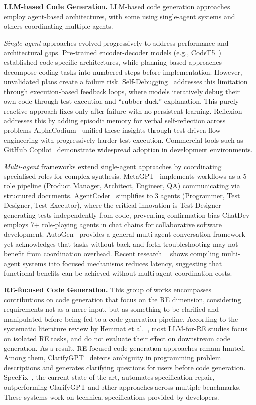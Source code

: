 \documentclass[sigconf,screen]{acmart}
\begin{document}
\textbf{LLM-based Code Generation.} LLM-based code generation approaches employ agent-based architectures, with some using single-agent systems and others coordinating multiple agents.

\textit{Single-agent} approaches evolved progressively to address performance and architectural gaps. Pre-trained encoder-decoder models (e.g., CodeT5~\cite{wang2021codet5}) established code-specific architectures, while planning-based approaches~\cite{jiang2024self} decompose coding tasks into numbered steps before implementation.
However, unvalidated plans create a failure risk. Self-Debugging~\cite{chen2023selfdebug} addresses this limitation through execution-based feedback loops, where models iteratively debug their own code through test execution and ``rubber duck'' explanation.
This purely reactive approach fixes only after failure with no persistent learning. Reflexion~\cite{shinn2023reflexion} addresses this by adding episodic memory for verbal self-reflection across problems
AlphaCodium~\cite{ridnik2024alphacodium} unified these insights through test-driven flow engineering with progressively harder test execution.
Commercial tools such as GitHub Copilot~\cite{copilot} demonstrate widespread adoption in development environments.

\textit{Multi-agent} frameworks extend single-agent approaches by coordinating specialised roles for complex synthesis. MetaGPT~\cite{hong2023metagpt} implements workflows as a 5-role pipeline (Product Manager, Architect, Engineer, QA) communicating via structured documents.
AgentCoder~\cite{huang2024agentcoder} simplifies to 3 agents (Programmer, Test Designer, Test Executor), where the critical innovation is Test Designer generating tests independently from code, preventing confirmation bias
ChatDev~\cite{chatdev} employs 7+ role-playing agents in chat chains for collaborative software development. AutoGen~\cite{wu2023autogen} provides a general multi-agent conversation framework yet acknowledges that tasks without back-and-forth troubleshooting may not benefit from coordination overhead. Recent research ~\cite{li2026single} shows compiling multi-agent systems into focused mechanisms reduces latency,
suggesting that functional benefits can be achieved without multi-agent coordination costs.

\textbf{RE-focused Code Generation.} This group of works encompasses contributions on code generation that focus on the RE dimension, considering requirements not as a mere input, but as something to be clarified and manipulated before being fed to a code generation pipeline.
According to the systematic literature review by Hemmat et al.~\cite{hemmat2025relr}, most LLM-for-RE studies focus on isolated RE tasks,  and do not evaluate their effect on downstream code generation. As a result, RE-focused code-generation approaches remain limited. Among them,
ClarifyGPT~\cite{mu2024clarifygpt} detects ambiguity in programming problem descriptions and generates clarifying questions for users before code generation. SpecFix~\cite{specfix2025}, the current state-of-the-art, automates specification repair, outperforming ClarifyGPT and other approaches across multiple benchmarks. These systems work on technical specifications provided by developers.
\end{document}
